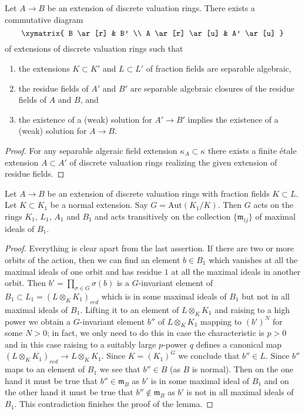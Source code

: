 \begin{lemma}
\label{lemma-solution-after-strict-henselization}
Let $A \to B$ be an extension of discrete valuation rings. There exists
a commutative diagram
$$
\xymatrix{
B \ar[r] & B' \\
A \ar[r] \ar[u] & A' \ar[u]
}
$$
of extensions of discrete valuation rings such that
\begin{enumerate}
\item the extensions $K \subset K'$ and $L \subset L'$ of fraction fields
are separable algebraic,
\item the residue fields of $A'$ and $B'$ are separable algebraic
closures of the residue fields of $A$ and $B$, and
\item the existence of a (weak) solution for $A' \to B'$ implies the
existence of a (weak) solution for $A \to B$.
\end{enumerate}
\end{lemma}

\begin{proof}
For any separable algeraic field extension $\kappa_A \subset \kappa$
there exists a finite \'etale extension $A \subset A'$ of discrete
valuation rings realizing the given extension of residue fields.






\end{proof}

\begin{lemma}
\label{lemma-galois}
Let $A \to B$ be an extension of discrete valuation rings with fraction fields
$K \subset L$. Let $K \subset K_1$ be a normal extension. Say
$G = \text{Aut}(K_1/K)$. Then $G$ acts on the rings $K_1$, $L_1$,
$A_1$ and $B_1$ and acts transitively on the collection $\{\mathfrak m_{ij}\}$
of maximal ideals of $B_1$.
\end{lemma}

\begin{proof}
Everything is clear apart from the last assertion. If there are two or
more orbits of the action, then we can find an element $b \in B_1$
which vanishes at all the maximal ideals of one orbit and has residue
$1$ at all the maximal ideals in another orbit. Then
$b' = \prod_{\sigma \in G} \sigma(b)$ is a $G$-invariant element of
$B_1 \subset L_1 = (L \otimes_K K_1)_{red}$ which is in some maximal
ideals of $B_1$
but not in all maximal ideals of $B_1$. Lifting it to an element of
$L \otimes_K K_1$ and raising to a high power we obtain a $G$-invariant
element $b''$ of $L \otimes_K K_1$ mapping to $(b')^N$ for some $N > 0$;
in fact, we only need to do this in case the characteristic is $p > 0$ and
in this case raising to a suitably large $p$-power $q$ defines a
canonical map $(L \otimes_K K_1)_{red} \to L \otimes_K K_1$.
Since $K = (K_1)^G$ we conclude that $b'' \in L$. Since $b''$ maps
to an element of $B_1$ we see that $b'' \in B$ (as $B$ is normal).
Then on the one hand it must be true that $b'' \in \mathfrak m_B$
as $b'$ is in some maximal ideal of $B_1$ and on the other hand it
must be true that $b'' \not \in \mathfrak m_B$ as $b'$ is not in
all maximal ideals of $B_1$. This contradiction finishes the proof of the
lemma.
\end{proof}

